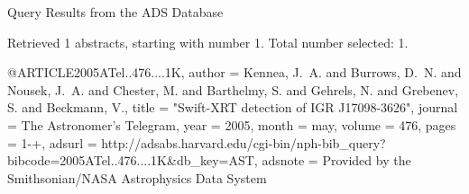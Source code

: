 Query Results from the ADS Database


Retrieved 1 abstracts, starting with number 1.  Total number selected: 1.

@ARTICLE{2005ATel..476....1K,
   author = {{Kennea}, J.~A. and {Burrows}, D.~N. and {Nousek}, J.~A. and 
	{Chester}, M. and {Barthelmy}, S. and {Gehrels}, N. and {Grebenev}, S. and 
	{Beckmann}, V.},
    title = "{Swift-XRT detection of IGR J17098-3626}",
  journal = {The Astronomer's Telegram},
     year = 2005,
    month = may,
   volume = 476,
    pages = {1-+},
   adsurl = {http://adsabs.harvard.edu/cgi-bin/nph-bib_query?bibcode=2005ATel..476....1K&db_key=AST},
  adsnote = {Provided by the Smithsonian/NASA Astrophysics Data System}
}


